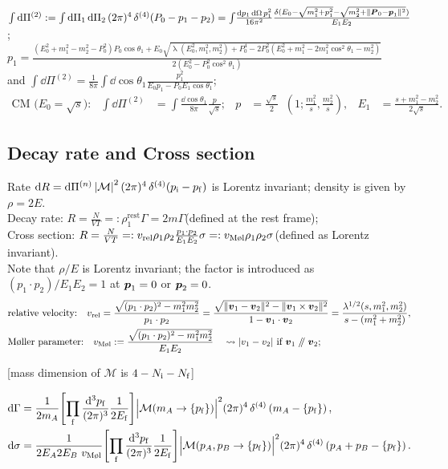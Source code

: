 \documentclass[new]{subfiles}
\begin{document}
$\int\dd\Pi^{(2)}:=
\int\dd\Pi_1\dd\Pi_2\,(2\pi)^4\ddelta[4](P_0-p_1-p_2)
=
\int\!\frac{\dd p_1\dd\Omega\,p_1^2}{16\pi^2}\frac{\delta(E_0-\sqrt{m_1^2+p_1^2}-\sqrt{m_2^2+\|\vc P_0-\vc p_1\|^2})}{E_1E_2}
$;
\\
$p_1=\frac{(E_0^2+m_1^2-m_2^2-P_0^2)P_0\cos\theta_1
 + E_0\sqrt{\mathop{\lambda}(E_0^2,m_1^2,m_2^2)+P_0^4-2P_0^2(E_0^2+m_1^2-2m_1^2\cos^2\theta_1-m_2^2)}
}{2(E_0^2-P_0^2\cos^2\theta_1)}$\\
and
$
\int\dd\Pi^{(2)}
=
\frac{1}{8\pi}\int\dd\cos\theta_{1}\frac{p_1^2}{E_0p_1-P_0E_1\cos\theta_1}
$;
\begin{align}
 \text{CM ($E_0=\sqrt{s}$):}& &
\int\dd\Pi^{(2)}&=\int\frac{\dd\cos\theta_{1}}{8\pi}\frac{p}{\sqrt{s}}
;&
 p &= \frac{\sqrt{s}}{2}\mathop{\lambda^{1/2}}\left(1;\frac{m_1^2}{s},\frac{m_2^2}{s}\right),
&
E_1 &= \frac{s+m_1^2-m_2^2}{2\sqrt{s}}.
\end{align}

\newpage
\subsection{Decay rate and Cross section}
\noindent
Rate $\dd R=\dd\Pi^{(n)}\left|\mathcal M\right|^2(2\pi)^4\ddelta[4](p\w i-p\w f)$ is Lorentz invariant; density is given by $\rho=2E$.
\\
Decay rate: $R = \frac{N}{VT} =: \rho_1^{\text{rest}}\Gamma = 2m\Gamma$\quad(defined at the rest frame);
\\
Cross section:
$R = \frac{N}{VT}
=: v\w{rel}\rho_1\rho_2 \frac{p_1\cdot p_2}{E_1E_2}\sigma=:v_{\text{M\o l}}\rho_1\rho_2\sigma$\quad (defined as Lorentz invariant).
\\
Note that $\rho/E$ is Lorentz invariant; the factor is introduced as $(p_1\cdot p_2)/E_1E_2=1$ at ${\boldsymbol{p}}_1=0$ or ${\boldsymbol{p}}_2=0$.
\begin{align}
&\text{relative velocity:}\quad
v\w{rel}
=
\frac{\sqrt{(p_1\cdot p_2)^2-m_1^2m_2^2}}{p_1\cdot p_2}
=
\frac{\sqrt{\|\vc v_1-\vc v_2\|^2-\|\vc v_1\times\vc v_2\|^2}}{1-\vc v_1\cdot\vc v_2}
=
\frac{\mathop{\lambda^{1/2}}(s,m_1^2,m_2^2)}{s-(m_1^2+m_2^2)},
\\
&\text{M\o ller parameter:}\quad
v_{\text{M\o l}}:= \frac{\sqrt{(p_1\cdot p_2)^2-m_1^2m_2^2}}{E_1E_2}\quad \leadsto \text{$|v_1-v_2|$ if $\vc v_1\parallel \vc v_2$};
\end{align}
\vspace{-1em}\par
{\hfill [mass dimension of $\mathcal M$ is $4-N_{\mathrm{i}}-N_{\mathrm{f}}$]}
\par\vspace{-2.4em}
\begin{align}
\dd\Gamma&=
\frac{1}{2m_A}\Biggl[\prod\w f\frac{\dd^3p\w f}{(2\pi)^3}\frac{1}{2E\w f}\Biggr]
\Bigl|\mathcal M(m_A\to\{p\w f\})\Bigr|^2(2\pi)^4\ddelta[4]\left(m_A-\{p\w f\}\right),
\\
\dd\sigma &=
\frac{1}{2E_A2E_B\ v_{\text{M\o l}}}\Biggl[\prod\w f\frac{\dd^3p\w f}{(2\pi)^3}\frac{1}{2E\w f}\Biggr]
\Bigl|\mathcal M(p_A,p_B\to\{p\w f\})\Bigr|^2(2\pi)^4\ddelta[4]\left(p_A+p_B-\{p\w f\}\right).
\end{align}
\end{document}
